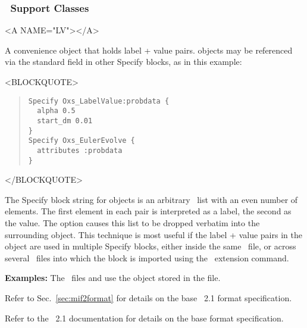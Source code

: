 \subsubsection{\MIF\ Support Classes}
\begin{rawhtml}<A NAME="LV"></A>\end{rawhtml}%
\begin{description}
%
\item[Oxs\_LabelValue:]
   A convenience object that holds label + value
   pairs.   objects may be referenced via the
   standard  field in other Specify blocks, as in
   this example:
\begin{rawhtml}<BLOCKQUOTE>\end{rawhtml}
\begin{quote}
\begin{verbatim}
Specify Oxs_LabelValue:probdata {
  alpha 0.5
  start_dm 0.01
}
Specify Oxs_EulerEvolve {
  attributes :probdata
}
\end{verbatim}
\end{quote}
\begin{rawhtml}</BLOCKQUOTE>\end{rawhtml}
   The Specify block string for  objects is an
   arbitrary \Tcl\ list with an even number of elements.  The first
   element in each pair is interpreted as a label, the second as the
   value.  The  option causes this list to be dropped
   verbatim into the surrounding object.  This technique is most useful
   if the label + value pairs in the  object are
   used in multiple Specify blocks, either inside the same \MIF\
   file, or across several \MIF\ files into which the
    block is imported using the  \MIF\
   extension command.

\textbf{Examples:} The \MIF\ files  and
    use the  object
   stored in the \fn{sample-attributes.tcl} file.

\end{description}

Refer to Sec.~\ref{sec:mif2format} for details on the base \MIF~2.1
format specification.
\begin{htmlonly}
Refer to the \MIF~2.1 documentation for details on the base format
specification.
\end{htmlonly}
